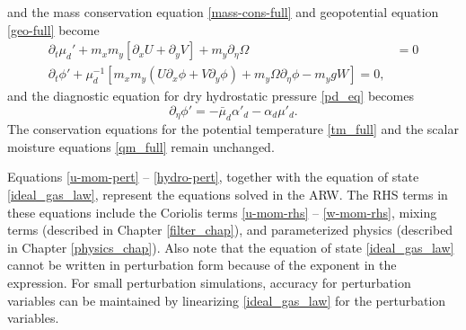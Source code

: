 %
and the mass conservation equation \eqref{mass-cons-full}
and geopotential equation \eqref{geo-full} become
%
\begin{align}
\partial_t  \mu_d' + m_x m_y[\partial_x U + \partial_y V] + m_y
\partial_\eta \Omega
& = 0 \\
%
\partial_t \phi' 
+ \mu_d^{-1}
[m_x m_y (U\partial_x\phi + V\partial_y\phi) + m_y
\Omega\partial_\eta\phi -m_y gW ] = 0,
\label{phi_pert}
%
\end{align}
%
\noindent
and the diagnostic equation for dry hydrostatic pressure \eqref{pd_eq} becomes
%
\begin{equation}
\partial_\eta \phi' =-\bar\mu_d \alpha'_d-\alpha_d\mu'_d.
\label{hydro-pert}
\end{equation}
The conservation equations for the potential temperature \eqref{tm_full} and 
the scalar moisture equations \eqref{qm_full} remain unchanged.

Equations \eqref{u-mom-pert} -- \eqref{hydro-pert},
together with the equation of state \eqref{ideal_gas_law},
represent the equations solved in the ARW.
The RHS terms in these equations include the
Coriolis terms \eqref{u-mom-rhs} -- \eqref{w-mom-rhs},
mixing terms (described in Chapter \ref{filter_chap}), and
parameterized physics (described in Chapter \ref{physics_chap}).  
Also note that the equation of state \eqref{ideal_gas_law} cannot be
written in perturbation form because of the exponent in the expression.
For small perturbation simulations, accuracy for perturbation variables
can be maintained by linearizing \eqref{ideal_gas_law} for the
perturbation variables.
%


